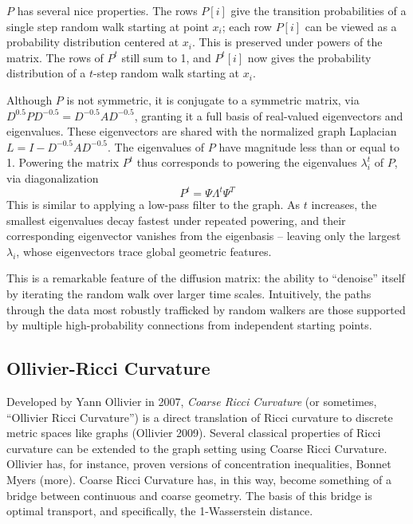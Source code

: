 \documentclass[
  letterpaper,
  DIV=11,
  numbers=noendperiod]{scrartcl}
\theoremstyle{plain}
\theoremstyle{definition}
\theoremstyle{plain}
\theoremstyle{definition}
\theoremstyle{plain}
\theoremstyle{remark}
\begin{document}
\(P\) has several nice properties. The rows \(P[i]\) give the transition
probabilities of a single step random walk starting at point \(x_{i}\);
each row \(P[i]\) can be viewed as a probability distribution centered
at \(x_{i}\). This is preserved under powers of the matrix. The rows of
\(P^t\) still sum to 1, and \(P^t[i]\) now gives the probability
distribution of a \(t\)-step random walk starting at \(x_{i}\).

Although \(P\) is not symmetric, it is conjugate to a symmetric matrix,
via \(D^{0.5}PD^{-0.5} = D^{-0.5}AD^{-0.5}\), granting it a full basis
of real-valued eigenvectors and eigenvalues. These eigenvectors are
shared with the normalized graph Laplacian
\(L = I - D^{-0.5}AD^{-0.5}\). The eigenvalues of \(P\) have magnitude
less than or equal to 1. Powering the matrix \(P^t\) thus corresponds to
powering the eigenvalues \(\lambda_{i}^t\) of \(P\), via diagonalization
\[
P^t = \Psi \Lambda^t \Psi^T
\] This is similar to applying a low-pass filter to the graph. As \(t\)
increases, the smallest eigenvalues decay fastest under repeated
powering, and their corresponding eigenvector vanishes from the
eigenbasis -- leaving only the largest \(\lambda_{i}\), whose
eigenvectors trace global geometric features.

This is a remarkable feature of the diffusion matrix: the ability to
``denoise'' itself by iterating the random walk over larger time scales.
Intuitively, the paths through the data most robustly trafficked by
random walkers are those supported by multiple high-probability
connections from independent starting points.

\subsection{Ollivier-Ricci Curvature}\label{ollivier-ricci-curvature}

Developed by Yann Ollivier in 2007, \emph{Coarse Ricci Curvature} (or
sometimes, ``Ollivier Ricci Curvature'') is a direct translation of
Ricci curvature to discrete metric spaces like graphs (Ollivier 2009).
Several classical properties of Ricci curvature can be extended to the
graph setting using Coarse Ricci Curvature. Ollivier has, for instance,
proven versions of concentration inequalities, Bonnet Myers (more).
Coarse Ricci Curvature has, in this way, become something of a bridge
between continuous and coarse geometry. The basis of this bridge is
optimal transport, and specifically, the 1-Wasserstein distance.
\end{document}
